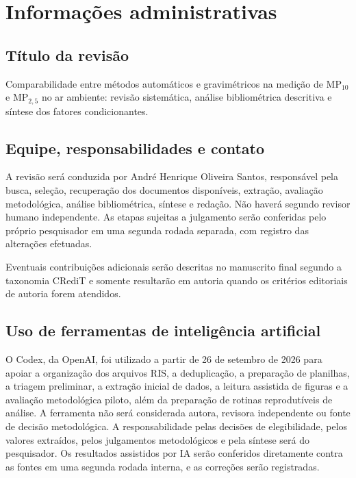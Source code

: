 \documentclass[11pt,a4paper]{article}
\newcommand{\MPdez}{MP$_{10}$}
\newcommand{\MPdoiscinco}{MP$_{2,5}$}
\begin{document}
\section{Informações administrativas}

\subsection{Título da revisão}

Comparabilidade entre métodos automáticos e gravimétricos na medição de \MPdez{}
e \MPdoiscinco{} no ar ambiente: revisão sistemática, análise bibliométrica
descritiva e síntese dos fatores condicionantes.

\subsection{Equipe, responsabilidades e contato}

A revisão será conduzida por André Henrique Oliveira Santos, responsável pela busca,
seleção, recuperação dos documentos disponíveis, extração, avaliação metodológica,
análise bibliométrica, síntese e redação. Não haverá segundo revisor humano
independente. As etapas sujeitas a julgamento serão conferidas pelo próprio
pesquisador em uma segunda rodada separada, com registro das alterações efetuadas.

Eventuais contribuições adicionais serão descritas no manuscrito final segundo a
taxonomia CRediT e somente resultarão em autoria quando os critérios editoriais de
autoria forem atendidos.

\subsection{Uso de ferramentas de inteligência artificial}

O Codex, da OpenAI, foi utilizado a partir de 26 de setembro de 2026 para apoiar a
organização dos arquivos RIS, a deduplicação, a preparação de planilhas, a triagem
preliminar, a extração inicial de dados, a leitura assistida de figuras e a avaliação
metodológica piloto, além da preparação de rotinas reprodutíveis de análise. A
ferramenta não será considerada autora, revisora independente ou fonte de decisão
metodológica. A responsabilidade pelas decisões de elegibilidade, pelos valores
extraídos, pelos julgamentos metodológicos e pela síntese será do pesquisador. Os
resultados assistidos por IA serão conferidos diretamente contra as fontes em uma
segunda rodada interna, e as correções serão registradas.
\end{document}
